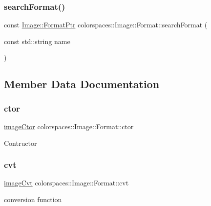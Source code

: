 \subsubsection{\texorpdfstring{search\+Format()}{searchFormat()}}
{\footnotesize\ttfamily const \hyperlink{classcolorspaces_1_1_image_ab3978cc7acc2b5e855f8c715f09667d1}{Image\+::\+Format\+Ptr} colorspaces\+::\+Image\+::\+Format\+::search\+Format (\begin{DoxyParamCaption}\item[{const std\+::string}]{name }\end{DoxyParamCaption})\hspace{0.3cm}{\ttfamily [static]}}



\subsection{Member Data Documentation}
\mbox{\label{classcolorspaces_1_1_image_1_1_format_a8aab62c6ca6ae1280cb4ba07702a5991}} 
\subsubsection{\texorpdfstring{ctor}{ctor}}
{\footnotesize\ttfamily \hyperlink{classcolorspaces_1_1_image_a5d086f8bb03d6eab9c3accfd0040e28d}{image\+Ctor} colorspaces\+::\+Image\+::\+Format\+::ctor}

Contructor \mbox{\label{classcolorspaces_1_1_image_1_1_format_ab7b83a3ddf1666e728782722dc3c081f}} 
\subsubsection{\texorpdfstring{cvt}{cvt}}
{\footnotesize\ttfamily \hyperlink{classcolorspaces_1_1_image_a8d8b6c8b517caac4cb685f4d73e2c8dc}{image\+Cvt} colorspaces\+::\+Image\+::\+Format\+::cvt}

conversion function \mbox{\label{classcolorspaces_1_1_image_1_1_format_a98396a43290ed1b2530caf35e858daa9}} 
